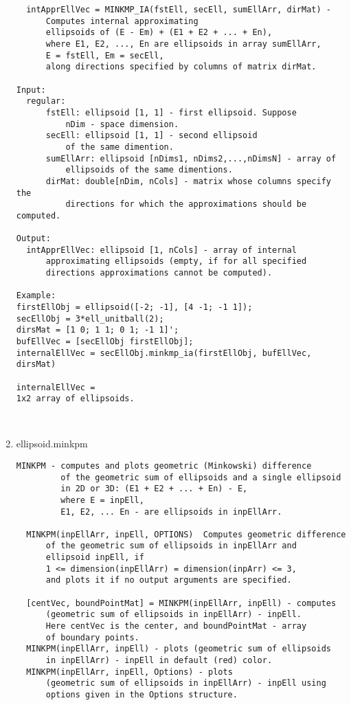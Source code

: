 \begin{enumerate}
\begin{lstlisting}
  intApprEllVec = MINKMP_IA(fstEll, secEll, sumEllArr, dirMat) -
      Computes internal approximating
      ellipsoids of (E - Em) + (E1 + E2 + ... + En),
      where E1, E2, ..., En are ellipsoids in array sumEllArr,
      E = fstEll, Em = secEll,
      along directions specified by columns of matrix dirMat.

Input:
  regular:
      fstEll: ellipsoid [1, 1] - first ellipsoid. Suppose
          nDim - space dimension.
      secEll: ellipsoid [1, 1] - second ellipsoid
          of the same dimention.
      sumEllArr: ellipsoid [nDims1, nDims2,...,nDimsN] - array of
          ellipsoids of the same dimentions.
      dirMat: double[nDim, nCols] - matrix whose columns specify the
          directions for which the approximations should be computed.

Output:
  intApprEllVec: ellipsoid [1, nCols] - array of internal
      approximating ellipsoids (empty, if for all specified
      directions approximations cannot be computed).

Example:
firstEllObj = ellipsoid([-2; -1], [4 -1; -1 1]);
secEllObj = 3*ell_unitball(2);
dirsMat = [1 0; 1 1; 0 1; -1 1]';
bufEllVec = [secEllObj firstEllObj];
internalEllVec = secEllObj.minkmp_ia(firstEllObj, bufEllVec, dirsMat)

internalEllVec =
1x2 array of ellipsoids.



\end{lstlisting}
\fontfamily{\familydefault}
\selectfont
\item {ellipsoid.minkpm}
\selectfont
\begin{lstlisting}
MINKPM - computes and plots geometric (Minkowski) difference
         of the geometric sum of ellipsoids and a single ellipsoid
         in 2D or 3D: (E1 + E2 + ... + En) - E,
         where E = inpEll,
         E1, E2, ... En - are ellipsoids in inpEllArr.

  MINKPM(inpEllArr, inpEll, OPTIONS)  Computes geometric difference
      of the geometric sum of ellipsoids in inpEllArr and
      ellipsoid inpEll, if
      1 <= dimension(inpEllArr) = dimension(inpArr) <= 3,
      and plots it if no output arguments are specified.

  [centVec, boundPointMat] = MINKPM(inpEllArr, inpEll) - computes
      (geometric sum of ellipsoids in inpEllArr) - inpEll.
      Here centVec is the center, and boundPointMat - array
      of boundary points.
  MINKPM(inpEllArr, inpEll) - plots (geometric sum of ellipsoids
      in inpEllArr) - inpEll in default (red) color.
  MINKPM(inpEllArr, inpEll, Options) - plots
      (geometric sum of ellipsoids in inpEllArr) - inpEll using
      options given in the Options structure.


\end{lstlisting}
\end{enumerate}
